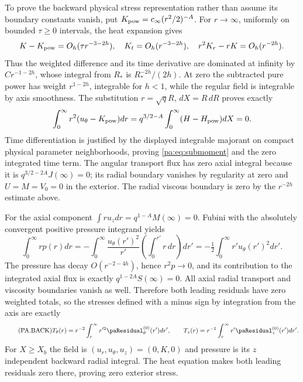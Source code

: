 \documentclass[10pt,a4paper]{article}
\begin{document}
To prove the backward physical stress representation rather than assume its
boundary constants vanish, put $K_{\rm pow}=c_\infty(r^2/2)^{-A}$.
For $r\to\infty$, uniformly on bounded $\tau\ge0$ intervals, the heat
expansion gives
\[
K-K_{\rm pow}=O_h(\tau r^{-3-2h}),\quad K_t=O_h(r^{-3-2h}),
\quad r^2K_r-rK=O_h(r^{-2h}).
\]
Thus the weighted difference and its time derivative are dominated at infinity
by $Cr^{-1-2h}$, whose integral from $R_*$ is $R_*^{-2h}/(2h)$.
At zero the subtracted pure power has weight $r^{1-2h}$, integrable for
$h<1$, while the regular field is integrable by axis smoothness.
The substitution $r=\sqrt qR$, $dX=R\,dR$ proves exactly
\[
\int_0^\infty r^2(u_\theta-K_{\rm pow})dr
=q^{3/2-A}\int_0^\infty(H-H_{\rm pow})dX=0.
\]
Time differentiation is justified by the displayed integrable majorant on
compact physical parameter neighborhoods, proving \eqref{pa:eq:submoment} and
the zero integrated time term.
The angular transport flux has zero axial integral because it is
$q^{3/2-2A}J(\infty)=0$; its radial boundary vanishes by regularity at
zero and $U=M=V_0=0$ in the exterior. The radial viscous boundary is zero
by the $r^{-2h}$ estimate above.

For the axial component $\int ru_zdr=q^{1-A}M(\infty)=0$.
Fubini with the absolutely convergent positive pressure integrand yields
\[
\int_0^\infty rp(r)dr
=-\int_0^\infty\frac{u_\theta(r')^2}{r'}
\left(\int_0^{r'}r\,dr\right)dr'
=-\tfrac12\int_0^\infty r'u_\theta(r')^2dr'.
\]
The pressure has decay $O(r^{-2-4h})$, hence $r^2p\to0$, and its contribution
to the integrated axial flux is exactly $q^{1-2A}S(\infty)=0$.
All axial radial transport and viscosity boundaries vanish as well.
Therefore both leading residuals have zero weighted totals, so the stresses
defined with a minus sign by integration from the axis are exactly
\begin{equation}\label{pa:eq:backward}\tag{PA.BACK}
T_\theta(r)=r^{-2}\int_r^\infty r'^2\paResidual_\theta^{(0)}(r')dr',\qquad
T_z(r)=r^{-1}\int_r^\infty r'\paResidual_z^{(0)}(r')dr'.
\end{equation}
For $X\ge X_b$ the field is $(u_r,u_\theta,u_z)=(0,K,0)$ and pressure
is its $z$ independent backward radial integral. The heat equation makes both
leading residuals zero there, proving zero exterior stress.
\end{document}
